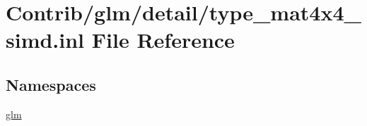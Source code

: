 \hypertarget{type__mat4x4__simd_8inl}{}\section{Contrib/glm/detail/type\+\_\+mat4x4\+\_\+simd.inl File Reference}
\label{type__mat4x4__simd_8inl}
\subsection*{Namespaces}
\begin{DoxyCompactItemize}
\item 
 \mbox{\hyperlink{namespaceglm}{glm}}
\end{DoxyCompactItemize}
